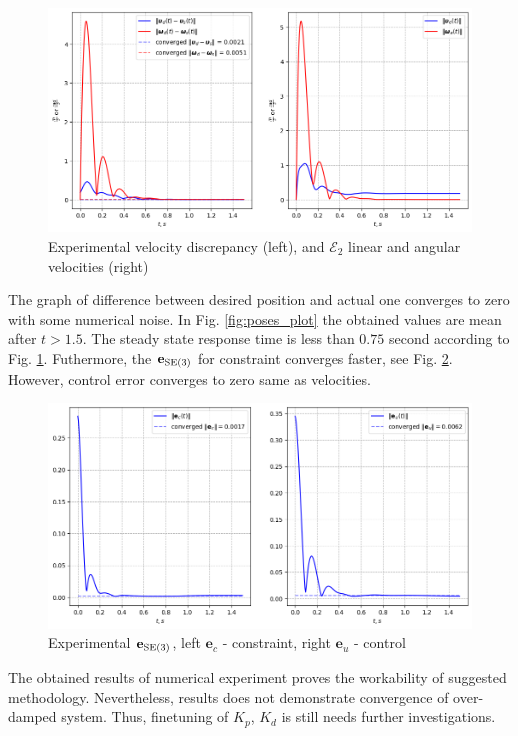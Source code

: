 \begin{figure}[H]
    \centering
    \includegraphics[scale=0.60]{figs/vels_history.png}
    \caption{Experimental velocity discrepancy (left), and 
    $\mathcal{E}_2$ linear and angular velocities (right)
    }
    \label{fig:vels_plot}
\end{figure}

The graph of difference between desired position and actual one converges to 
zero with some numerical noise. In Fig. \ref{fig:poses_plot} the obtained 
values are mean after $t > 1.5$. The steady state response time is less 
than $0.75$ second according to Fig. \ref{fig:vels_plot}. Futhermore, 
the $\mathbf{e}_{\text{SE}(3)}$ for constraint converges faster, see  
Fig. \ref{fig:errors_plot}. However, control error converges to zero 
same as velocities.

\begin{figure}[H]
    \centering
    \includegraphics[scale=0.60]{figs/errors_history.png}
    \caption{Experimental $\mathbf{e}_{\text{SE}(3)}$, left $\mathbf{e}_c$ - constraint, 
    right $\mathbf{e}_u$ - control}
    \label{fig:errors_plot}
\end{figure}

The obtained results of numerical experiment proves the workability 
of suggested methodology. Nevertheless, results does not demonstrate convergence 
of over-damped system. Thus, finetuning of $K_p$, $K_d$ is still needs 
further investigations.
